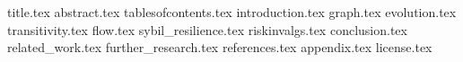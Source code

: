\documentclass[11pt]{llncs}
\begin{document}
  {title.tex}
  \thispagestyle{plain}
  {abstract.tex}
  \clearpage
  {tablesofcontents.tex}
  {introduction.tex}
  {graph.tex}
  {evolution.tex}
  {transitivity.tex}
  {flow.tex}
  {sybil_resilience.tex}
  {riskinvalgs.tex}
  {conclusion.tex}
  {related_work.tex}
  {further_research.tex}
  {references.tex}
  \newpage
  {appendix.tex}
  \newpage
  {license.tex}
\end{document}
